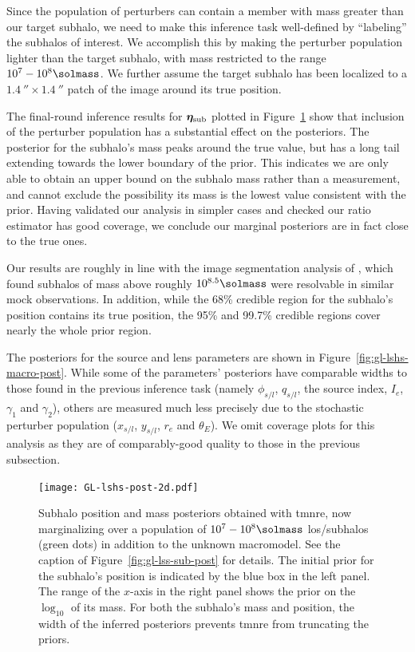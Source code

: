 Since the population of perturbers can contain a member with mass greater than our target subhalo, we need to make this inference task well-defined by ``labeling'' the subhalos of interest. We accomplish this by making the perturber population lighter than the target subhalo, with mass restricted to the range $10^7-10^8\si{\solmass}$. We further assume the target subhalo has been localized to a $\SI{1.4}{''}\times\SI{1.4}{''}$ patch of the image around its true position.

The final-round inference results for ${{\bm{\eta}}}_\mathrm{sub}$ plotted in Figure~\ref{fig:gl-lshs-post} show that inclusion of the perturber population has a substantial effect on the posteriors. The posterior for the subhalo's mass peaks around the true value, but has a long tail extending towards the lower boundary of the prior. This indicates we are only able to obtain an upper bound on the subhalo mass rather than a measurement, and cannot exclude the possibility its mass is the lowest value consistent with the prior. Having validated our analysis in simpler cases and checked our ratio estimator has good coverage, we conclude our marginal posteriors are in fact close to the true ones.

Our results are roughly in line with the image segmentation analysis of \cite{Ostdiek:2020cqz,Ostdiek:2020mvo}, which found subhalos of mass above roughly  $10^{8.5}\si{\solmass}$ were resolvable in similar mock observations. In addition, while the 68\% credible region for the subhalo's position contains its true position, the 95\% and 99.7\% credible regions cover nearly the whole prior region.

The posteriors for the source and lens parameters are shown in Figure~\ref{fig:gl-lshs-macro-post}. While some of the parameters' posteriors have comparable widths to those found in the previous inference task (namely $\phi_{s/l}$, $q_{s/l}$, the source index, $I_e$, $\gamma_1$ and $\gamma_2$), others are measured much less precisely due to the stochastic perturber population ($x_{s/l}$, $y_{s/l}$, $r_e$ and $\theta_E$). We omit coverage plots for this analysis as they are of comparably-good quality to those in the previous subsection.

\begin{figure}
    \centering
    \texttt{[image: GL-lshs-post-2d.pdf]}
    \caption{Subhalo position and mass posteriors obtained with \gls*{tmnre}, now marginalizing over a population of $10^7-10^8\si{\solmass}$ \gls*{los}/subhalos (green dots) in addition to the unknown macromodel. See the caption of Figure~\ref{fig:gl-lss-sub-post} for details. The initial prior for the subhalo's position is indicated by the blue box in the left panel. The range of the $x$-axis in the right panel shows the prior on the $\log_{10}$ of its mass. For both the subhalo's mass and position, the width of the inferred posteriors prevents \gls*{tmnre} from truncating the priors.}
    \label{fig:gl-lshs-post}
\end{figure}

